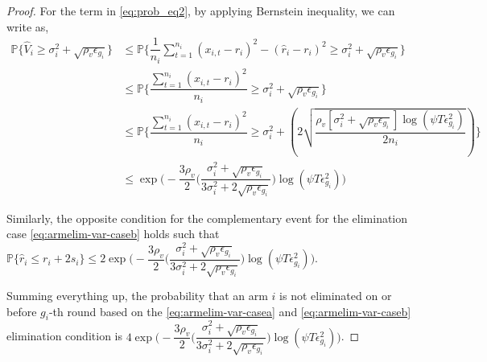 \begin{proof}
For the term in \ref{eq:prob_eq2}, by applying Bernstein inequality, we can write as,
 \begin{align*}
\mathbb{P}\bigg\lbrace \hat{V}_{i}\geq \sigma_{i}^{2}+\sqrt{\rho_{v}\epsilon_{g_{i}}}\bigg\rbrace &\leq \mathbb{P}\bigg\lbrace \dfrac{1}{n_{i}}\sum_{t=1}^{n_{i}}(x_{i,t}-r_{i})^{2}-(\hat{r}_{i}-r_{i})^{2}\geq \sigma_{i}^{2}+\sqrt{\rho_{v}\epsilon_{g_{i}}}\bigg\rbrace\\
&\leq \mathbb{P}\bigg\lbrace \dfrac{\sum_{t=1}^{n_{i}}(x_{i,t}-r_{i})^{2}}{n_{i}}\geq \sigma_{i}^{2}+\sqrt{\rho_{v}\epsilon_{g_{i}}} \bigg\rbrace\\
&\leq \mathbb{P}\bigg\lbrace \dfrac{\sum_{t=1}^{n_{i}}(x_{i,t}-r_{i})^{2}}{n_{i}}\geq \sigma_{i}^{2} + (2\sqrt{\dfrac{\rho_v [\sigma_{i}^{2}+\sqrt{\rho_{v}\epsilon_{g_{i}}}]\log(\psi T\epsilon_{g_{i}}^{2})}{2n_{i}}})\bigg\rbrace\\
&\leq \exp\bigg(- \dfrac{3\rho_v}{2} \bigg(\dfrac{\sigma_{i}^{2}+\sqrt{\rho_{v}\epsilon_{g_{i}}}}{3\sigma_{i}^{2}+2\sqrt{\rho_v \epsilon_{g_{i}}}}\bigg) \log(\psi T\epsilon_{g_{i}}^{2}) \bigg) 
  \end{align*}
  
Similarly, the opposite condition for the complementary event for the elimination case \ref{eq:armelim-var-caseb} holds such that $\mathbb{P}\lbrace\hat{r}_{i}\leq r_{i} + 2s_{i}\rbrace \leq 2\exp\bigg(- \dfrac{3\rho_v}{2} \bigg(\dfrac{\sigma_{i}^{2}+\sqrt{\rho_{v}\epsilon_{g_{i}}}}{3\sigma_{i}^{2}+2\sqrt{\rho_v \epsilon_{g_{i}}}}\bigg) \log(\psi T\epsilon_{g_{i}}^{2}) \bigg)$.

  Summing everything up, the probability that an arm ${i}$ is not eliminated on or before $g_{i}$-th round based on the \ref{eq:armelim-var-casea} and \ref{eq:armelim-var-caseb} elimination condition is  $4\exp\bigg(- \dfrac{3\rho_v}{2} \bigg(\dfrac{\sigma_{i}^{2}+\sqrt{\rho_{v}\epsilon_{g_{i}}}}{3\sigma_{i}^{2}+2\sqrt{\rho_v \epsilon_{g_{i}}}}\bigg) \log(\psi T\epsilon_{g_{i}}^{2}) \bigg)$. 
  

\end{proof}
